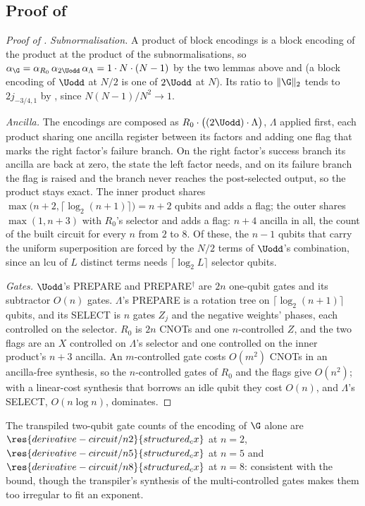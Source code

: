 \subsection{Proof of \texorpdfstring{}{the cost of the structured encoding}}
\label{app:proof-standard-cost}

\begin{proof}[Proof of ]
\emph{Subnormalisation.} A product of block encodings is a block encoding of the product at the product of the subnormalisations, so $\alpha_\G=\alpha_{R_0}\,\alpha_{2\Uodd}\,\alpha_\Lambda=1\cdot N\cdot(N-1)$ by the two lemmas above and  (a block encoding of $\Uodd$ at $N/2$ is one of $2\Uodd$ at $N$). Its ratio to $\|\G\|_2$ tends to $2j_{-3/4,1}$ by , since $N(N-1)/N^2\to1$.

\emph{Ancilla.} The encodings are composed as $R_0\cdot\bigl((2\Uodd)\cdot\Lambda\bigr)$, $\Lambda$ applied first, each product sharing one ancilla register between its factors and adding one flag that marks the right factor's failure branch. On the right factor's success branch its ancilla are back at zero, the state the left factor needs, and on its failure branch the flag is raised and the branch never reaches the post-selected output, so the product stays exact. The inner product shares $\max\bigl(n+2,\lceil\log_2(n+1)\rceil\bigr)=n+2$ qubits and adds a flag; the outer shares $\max(1,n+3)$ with $R_0$'s selector and adds a flag: $n+4$ ancilla in all, the count of the built circuit for every $n$ from $2$ to $8$. Of these, the $n-1$ qubits that carry the uniform superposition are forced by the $N/2$ terms of $\Uodd$'s combination, since an \gls{lcu} of $L$ distinct terms needs $\lceil\log_2L\rceil$ selector qubits.

\emph{Gates.} $\Uodd$'s PREPARE and PREPARE$^\dagger$ are $2n$ one-qubit gates and its subtractor $O(n)$ gates. $\Lambda$'s PREPARE is a rotation tree on $\lceil\log_2(n+1)\rceil$ qubits, and its SELECT is $n$ gates $Z_j$ and the negative weights' phases, each controlled on the selector. $R_0$ is $2n$ CNOTs and one $n$-controlled $Z$, and the two flags are an $X$ controlled on $\Lambda$'s selector and one controlled on the inner product's $n+3$ ancilla. An $m$-controlled gate costs $O(m^2)$ CNOTs in an ancilla-free synthesis, so the $n$-controlled gates of $R_0$ and the flags give $O(n^2)$; with a linear-cost synthesis that borrows an idle qubit \cite{barenco1995elementary} they cost $O(n)$, and $\Lambda$'s SELECT, $O(n\log n)$, dominates.
\end{proof}
The transpiled two-qubit gate counts of the encoding of $\G$ alone are $\res{derivative-circuit/n2}{structured_cx}$ at $n=2$, $\res{derivative-circuit/n5}{structured_cx}$ at $n=5$ and $\res{derivative-circuit/n8}{structured_cx}$ at $n=8$: consistent with the bound, though the transpiler's synthesis of the multi-controlled gates makes them too irregular to fit an exponent.

